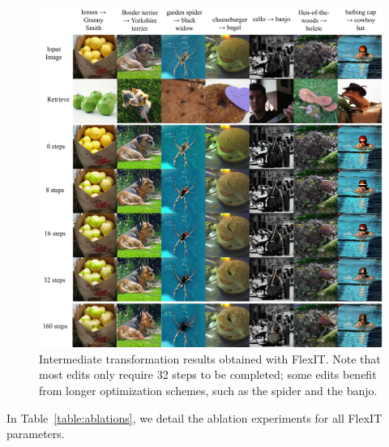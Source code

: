 \begin{figure}[H]
    \hspace{-2cm}
    \includegraphics[width=1.2\linewidth]{images/flexit/assets/steps.pdf}
    \caption{Intermediate transformation results obtained with FlexIT. Note that most edits only require 32 steps to be completed; some edits benefit from longer optimization schemes, such as the  spider and the banjo.
    }
    \label{fig:steps}
\end{figure}





In Table~\ref{table:ablations}, we detail the ablation experiments for all FlexIT parameters.

